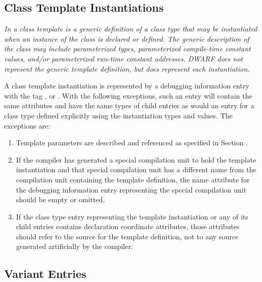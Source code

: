 \subsection{Class Template Instantiations}
\label{chap:classtemplateinstantiations}

\textit{In  a class template is a generic definition of a class
type that may be instantiated when an instance of the class
is declared or defined. The generic description of the class may include
parameterized types, parameterized compile-time constant
values, and/or parameterized run-time constant addresses. 
DWARF does not represent the generic template
definition, but does represent each instantiation.}

A class template instantiation is represented by a
debugging information entry with the tag \DWTAGclasstype,
\DWTAGstructuretype{} or 
\DWTAGuniontype. With the following
exceptions, such an entry will contain the same attributes
and have the same types of child entries as would an entry
for a class type defined explicitly using the instantiation
types and values. The exceptions are:

\begin{enumerate}[1. ]
\item Template parameters are described and referenced as
specified in Section .

\item If the compiler has generated a special compilation unit to
hold the 
template instantiation and that special compilation
unit has a different name from the compilation unit containing
the template definition, the name attribute for the debugging
information entry representing the special compilation unit
should be empty or omitted.

\item If the class type entry representing the template
instantiation or any of its child entries contains declaration
coordinate attributes, those attributes should refer to
the source for the template definition, not to any source
generated artificially by the compiler.
\end{enumerate}

\subsection{Variant Entries}
\label{chap:variantentries}


